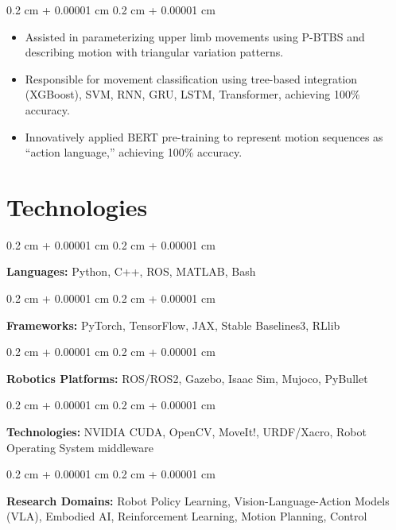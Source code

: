 \documentclass[10pt, letterpaper]{article}
\newenvironment{highlights}{
    \begin{itemize}[
        topsep=0.10 cm,
        parsep=0.10 cm,
        partopsep=0pt,
        itemsep=0pt,
        leftmargin=0.4 cm + 10pt
    ]
}{
    \end{itemize}
} %
\newenvironment{onecolentry}{
    \begin{adjustwidth}{
        0.2 cm + 0.00001 cm
    }{
        0.2 cm + 0.00001 cm
    }
}{
    \end{adjustwidth}
} %
\begin{document}
\vspace{0.10 cm}
\begin{onecolentry}
    \begin{highlights}
        \item Assisted in parameterizing upper limb movements using P-BTBS and describing motion with triangular variation patterns.
        \item Responsible for movement classification using tree-based integration (XGBoost), SVM, RNN, GRU, LSTM, Transformer, achieving 100\% accuracy.
        \item Innovatively applied BERT pre-training to represent motion sequences as “action language,” achieving 100\% accuracy.
    \end{highlights}
\end{onecolentry}




    
    \section{Technologies}

\begin{onecolentry}
    \textbf{Languages:} Python, C++, ROS, MATLAB, Bash
\end{onecolentry}

\vspace{0.2 cm}

\begin{onecolentry}
    \textbf{Frameworks:} PyTorch, TensorFlow, JAX, Stable Baselines3, RLlib
\end{onecolentry}

\vspace{0.2 cm}

\begin{onecolentry}
    \textbf{Robotics Platforms:} ROS/ROS2, Gazebo, Isaac Sim, Mujoco, PyBullet
\end{onecolentry}

\vspace{0.2 cm}

\begin{onecolentry}
    \textbf{Technologies:} NVIDIA CUDA, OpenCV, MoveIt!, URDF/Xacro, Robot Operating System middleware
\end{onecolentry}

\vspace{0.2 cm}

\begin{onecolentry}
    \textbf{Research Domains:} Robot Policy Learning, Vision-Language-Action Models (VLA), Embodied AI, Reinforcement Learning, Motion Planning, Control
\end{onecolentry}
\end{document}
